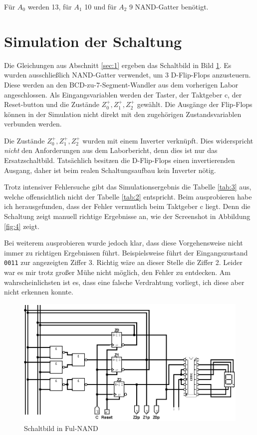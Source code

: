 \documentclass[
    paper=a4,
]{scrartcl}
\begin{document}
    Für $A_0$ werden 13, für $A_1$ 10 und für $A_2$ 9 NAND-Gatter benötigt.

\section{Simulation der Schaltung}
    Die Gleichungen aus Abschnitt \ref{sec:1} ergeben das Schaltbild in Bild \ref{fig:3}. Es wurden ausschließlich NAND-Gatter verwendet, um 3 D-Flip-Flops anzusteuern. Diese werden an den BCD-zu-7-Segment-Wandler aus dem vorherigen Labor angeschlossen. Als Eingangsvariablen werden der Taster, der Taktgeber c, der Reset-button und die Zustände \(Z_0^+, Z_1^+, Z_2^+\) gewählt. Die Ausgänge der Flip-Flops können in der Simulation nicht direkt mit den zugehörigen Zustandsvariablen verbunden werden. 
    
    Die Zustände \(Z_0^+, Z_1^+, Z_2^+\) wurden mit einem Inverter verknüpft. Dies widerspricht \textit{nicht} den Anforderungen aus dem Laborbericht, denn dies ist nur das Ersatzschaltbild. Tatsächlich besitzen die D-Flip-Flops einen invertierenden Ausgang, daher ist beim realen Schaltungsaufbau kein Inverter nötig.

    Trotz intensiver Fehlersuche gibt das Simulationsergebnis die Tabelle \ref{tab:3} aus, welche offensichtlich nicht der Tabelle \ref{tab:2} entspricht. Beim ausprobieren habe ich herausgefunden, dass der Fehler vermutlich beim Taktgeber c liegt. Denn die Schaltung zeigt manuell richtige Ergebnisse an, wie der Screenshot in Abbildung \ref{fig:4} zeigt. 

    Bei weiterem ausprobieren wurde jedoch klar, dass diese Vorgehensweise nicht immer zu richtigen Ergebnissen führt. Beispielsweise führt der Eingangszustand \texttt{0011} zur angezeigten Ziffer 3. Richtig wäre an dieser Stelle die Ziffer 2. Leider war es mir trotz großer Mühe nicht möglich, den Fehler zu entdecken. Am wahrscheinlichsten ist es, dass eine falsche Verdrahtung vorliegt, ich diese aber nicht erkennen konnte.
    
    \begin{figure}[h]
        \centering
        \includegraphics[width=\textwidth]{simulation.png}
        \caption{Schaltbild in Ful-NAND}
        \label{fig:3}
    \end{figure}
\end{document}
